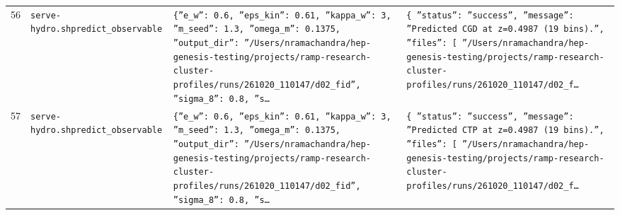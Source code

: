 \documentclass[11pt,a4paper]{article}
\begin{document}
\begin{longtable}{@{}p{}p{}p{}p{}@{}}
56 & \texttt{serve-hydro.sh}\newline\texttt{predict\_\allowbreak{}observable} & \texttt{\{''e\_\allowbreak{}w'':\allowbreak{} 0.6,\allowbreak{} ''eps\_\allowbreak{}kin'':\allowbreak{} 0.61,\allowbreak{} ''kappa\_\allowbreak{}w'':\allowbreak{} 3,\allowbreak{} ''m\_\allowbreak{}seed'':\allowbreak{} 1.3,\allowbreak{} ''omega\_\allowbreak{}m'':\allowbreak{} 0.1375,\allowbreak{} ''output\_\allowbreak{}dir'':\allowbreak{} ''/\allowbreak{}Users/\allowbreak{}nramachandra/\allowbreak{}hep-genesis-testing/\allowbreak{}projects/\allowbreak{}ramp-research-cluster-profiles/\allowbreak{}runs/\allowbreak{}261020\_\allowbreak{}110147/\allowbreak{}d02\_\allowbreak{}fid'',\allowbreak{} ''sigma\_\allowbreak{}8'':\allowbreak{} 0.8,\allowbreak{} ''s\ldots{}\allowbreak{}} & \texttt{\{   ''status'':\allowbreak{} ''success'',\allowbreak{}   ''message'':\allowbreak{} ''Predicted CGD at z=\allowbreak{}0.4987 (19 bins)\allowbreak{}.'',\allowbreak{}   ''files'':\allowbreak{} [     ''/\allowbreak{}Users/\allowbreak{}nramachandra/\allowbreak{}hep-genesis-testing/\allowbreak{}projects/\allowbreak{}ramp-research-cluster-profiles/\allowbreak{}runs/\allowbreak{}261020\_\allowbreak{}110147/\allowbreak{}d02\_\allowbreak{}f\ldots{}\allowbreak{}} \\
57 & \texttt{serve-hydro.sh}\newline\texttt{predict\_\allowbreak{}observable} & \texttt{\{''e\_\allowbreak{}w'':\allowbreak{} 0.6,\allowbreak{} ''eps\_\allowbreak{}kin'':\allowbreak{} 0.61,\allowbreak{} ''kappa\_\allowbreak{}w'':\allowbreak{} 3,\allowbreak{} ''m\_\allowbreak{}seed'':\allowbreak{} 1.3,\allowbreak{} ''omega\_\allowbreak{}m'':\allowbreak{} 0.1375,\allowbreak{} ''output\_\allowbreak{}dir'':\allowbreak{} ''/\allowbreak{}Users/\allowbreak{}nramachandra/\allowbreak{}hep-genesis-testing/\allowbreak{}projects/\allowbreak{}ramp-research-cluster-profiles/\allowbreak{}runs/\allowbreak{}261020\_\allowbreak{}110147/\allowbreak{}d02\_\allowbreak{}fid'',\allowbreak{} ''sigma\_\allowbreak{}8'':\allowbreak{} 0.8,\allowbreak{} ''s\ldots{}\allowbreak{}} & \texttt{\{   ''status'':\allowbreak{} ''success'',\allowbreak{}   ''message'':\allowbreak{} ''Predicted CTP at z=\allowbreak{}0.4987 (19 bins)\allowbreak{}.'',\allowbreak{}   ''files'':\allowbreak{} [     ''/\allowbreak{}Users/\allowbreak{}nramachandra/\allowbreak{}hep-genesis-testing/\allowbreak{}projects/\allowbreak{}ramp-research-cluster-profiles/\allowbreak{}runs/\allowbreak{}261020\_\allowbreak{}110147/\allowbreak{}d02\_\allowbreak{}f\ldots{}\allowbreak{}} \\

\end{longtable}
\end{document}
